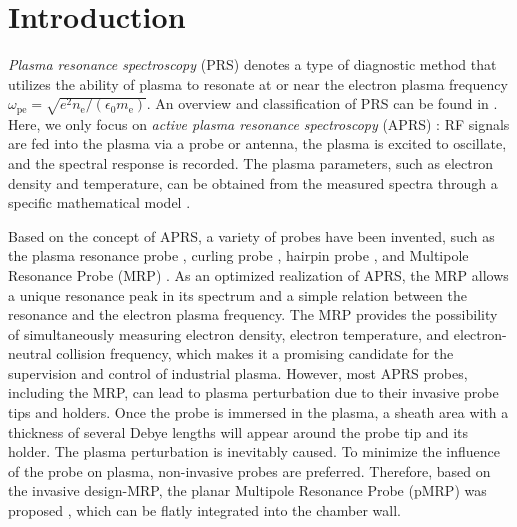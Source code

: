 \documentclass[superscriptaddress,preprint]{revtex4}  %
\begin{document}
	
\section{Introduction}
\textit{Plasma resonance spectroscopy} (PRS) denotes a type of diagnostic method that utilizes the ability of plasma to resonate at or near the electron plasma frequency $\omega_\mathrm{pe}=\sqrt{e^2 n_\mathrm{e}/ \left(\epsilon_0 m_\mathrm{e}\right)}$. An overview and classification of PRS can be found in \cite{Lapke2011}. Here, we only focus on \textit{active plasma resonance spectroscopy} (APRS) \cite{Lapke2013,Oberrath2014-1}: RF signals are fed into the plasma via a probe or antenna, the plasma is excited to oscillate, and the spectral response is recorded. The plasma parameters, such as electron density and temperature, can be obtained from the measured spectra through a specific mathematical model \cite{Lapke2011,Lapke2013,Oberrath2014-1,Harp1964,Crawford1965,Arshadi2016,Arshadi2017,Haas2005,Xu2010,	Lapke2008,Oberrath2014-2,Oberrath2020,Oberrath2016,Oberrath2018,Friedrichs2018,Buckley1966}. 

Based on the concept of APRS, a variety of probes have been invented, such as the plasma resonance probe \cite{Harp1964,Crawford1965,Takayama1960}, curling probe \cite{Arshadi2016,Arshadi2017,Pandey2014}, hairpin probe \cite{Haas2005,Xu2010,Piejak2004,Piejak2005}, and Multipole Resonance Probe (MRP) \cite{Lapke2011,Lapke2008,Oberrath2014-2,Oberrath2020,Fiebrandt2017}. As an optimized realization of APRS, the MRP allows a unique resonance peak in its spectrum and a simple relation between the resonance and the electron plasma frequency. The MRP provides the possibility of simultaneously measuring electron density, electron temperature, and electron-neutral collision frequency, which makes it a promising candidate for the supervision and control of industrial plasma. However, most APRS probes, including the MRP, can lead to plasma perturbation due to their invasive probe tips and holders. Once the probe is immersed in the plasma, a sheath area with a thickness of several Debye lengths will appear around the probe tip and its holder. The plasma perturbation is inevitably caused. To minimize the influence of the probe on plasma, non-invasive probes are preferred. Therefore, based on the invasive design-MRP, the planar Multipole Resonance Probe (pMRP) was proposed \cite{Schulz2014-1}, which can be flatly integrated into the chamber wall.
\end{document}
